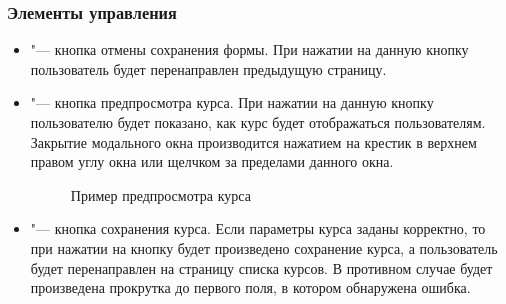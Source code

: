 \subsubsection{Элементы управления}
	\begin{itemize}
		\item {} "--- кнопка отмены сохранения формы. При нажатии на данную кнопку пользователь будет перенаправлен предыдущую страницу.
		\item {} "--- кнопка предпросмотра курса. При нажатии на данную кнопку пользователю будет показано, как курс будет отображаться пользователям. Закрытие модального окна производится нажатием на крестик в верхнем правом углу окна или щелчком за пределами данного окна.
		\begin{figure}[H]
			\caption{Пример предпросмотра курса}
			\label{img:course:course_preview}
		\end{figure}
		
		\item {} "--- кнопка сохранения курса. Если параметры курса заданы корректно, то при нажатии на кнопку будет произведено сохранение курса, а пользователь будет перенаправлен на страницу списка курсов. В противном случае будет произведена прокрутка до первого поля, в котором обнаружена ошибка.
	\end{itemize}